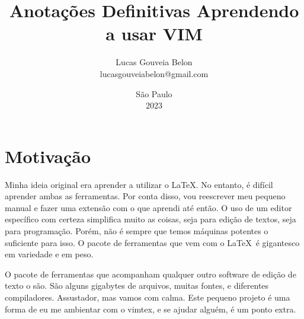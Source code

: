 \documentclass[a4paper, 12pt]{article}
\begin{document}
\title{%
    \textbf{                            %
    Anotações Definitivas               %
    }%
    \break                              %
    Aprendendo a usar VIM               %
}                                       %
\author{                                %
    Lucas Gouveia Belon                 %
    \\                                  %
    lucasgouveiabelon@gmail.com         %
}                                       %
\date{\vspace{2.2cm}São Paulo\\2023}    %
\maketitle                              %
\newpage                                %

\tableofcontents                        %
\newpage                                %


\newcommand{\TUG}{\textsc{TeX Users Group}}
\newcommand{\vimcommand}[1]{%
    \sethlcolor{black}%
    \textbf{\textcolor{white}{\hl{#1}}}%
}


\section{Motivação}
Minha ideia original era aprender a utilizar o \LaTeX.
No entanto, é difícil aprender ambas as ferramentas.
Por conta disso, vou reescrever meu pequeno manual e fazer uma extensão com o que aprendi até então.
O uso de um editor específico com certeza simplifica muito as coisas, seja para edição de textos, seja para programação.
Porém, não é sempre que temos máquinas potentes o suficiente para isso.
O pacote de ferramentas que vem com o \LaTeX\ é gigantesco em variedade e em peso.

O pacote de ferramentas que acompanham qualquer outro software de edição de texto o são.
São alguns gigabytes de arquivos, muitas fontes, e diferentes compiladores.
Assustador, mas vamos com calma.
Este pequeno projeto é uma forma de eu me ambientar com o vimtex, e se ajudar alguém, é um ponto extra.
\end{document}
